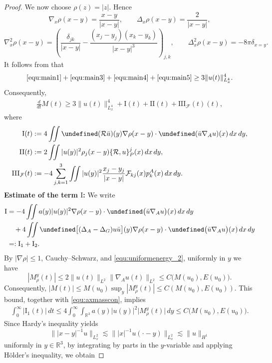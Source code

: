 \documentclass[10pt%
]{amsart}
\numberwithin{equation}{section}
\let\Im=\undefined\DeclareMathOperator*{\Im}{Im}
\newcommand{\R}{\mathbb{R}}
\theoremstyle{definition}
\newcommand{\Fcurv}{\mathcal{F}}
\begin{document}
\begin{proof}
	We now choose $\rho(z)=|z|$. Hence
	\[
	\nabla_x\rho(x-y)=\frac{x-y}{|x-y|},\qquad
	\Delta_x\rho(x-y)=\frac2{|x-y|},
	\]
	\[
	\nabla_x^2\rho(x-y)
	=\left(\frac{\delta_{jk}}{|x-y|}
	-\frac{(x_j-y_j)(x_k-y_k)}{|x-y|^3}\right)_{j,k},
	\qquad
	\Delta_x^2\rho(x-y)=-8\pi\delta_{x=y}.
	\]
	It follows from \cite[Section~4]{CCL} that
	\begin{equation}\label{equ:lowbtvz}
		\eqref{equ:main1}+\eqref{equ:main3}+\eqref{equ:main4}+\eqref{equ:main5}
		\ge3\|u(t)\|_{L_x^4}^4.
	\end{equation}
	Consequently,
	\begin{align}\label{equ:Maimt}
		\frac{d}{dt}M(t)
		\ge3\|u(t)\|_{L_x^4}^4+\mathrm I(t)+\mathrm{II}(t)+\mathrm{III}_{\Fcurv}(t)(t),
	\end{align}
	where
	\begin{align*}
	\mathrm I(t)
	&:=4\iint\Im(\mathcal R\bar u)(y)\nabla\rho(x-y)\cdot\Im(\bar u\nabla_Au)(x)\,dx\,dy,\\
	\mathrm{II}(t)
	&:=2\iint|u(y)|^2\rho_j(x-y)\{\mathcal R,u\}_P^j(x)\,dx\,dy,\\
	\mathrm{III}_{\Fcurv}(t)
	&:=-4\sum_{j,k=1}^3\iint|u(y)|^2
	\frac{x_j-y_j}{|x-y|}\Fcurv_{kj}(x)p_k^A(x)\,dx\,dy.
	\end{align*}
	{\bf Estimate of the term $\textrm{I}$:}  We write
	\begin{align*}
		\textrm{I}&=-4\iint a(y)|u(y)|^2\nabla \rho(x-y)\cdot \Im \big(\bar{u}\nabla_A u \big)(x)\,dx\,dy\\
		&\quad +4\iint \Im \big[ (\Delta_A-\Delta_G)u\bar{u}\big](y)\nabla \rho(x-y)\cdot \Im \big(\bar{u}\nabla_Au\big)(x)\,dx\,dy\\
		&=: \textrm{I}_1+\textrm{I}_2.
	\end{align*}
	By $|\nabla\rho|\le1$, Cauchy--Schwarz, and \eqref{equ:uniformenergy_2}, uniformly in $y$ we have
	\[
	|M_\rho^y(t)|\le2\|u(t)\|_{L^2}\|\nabla_Au(t)\|_{L^2}
	\le C\big(M(u_0),E(u_0)\big).
	\]
	Consequently, $|M(t)|\le M(u_0)\sup_y|M_\rho^y(t)|\le C(M(u_0),E(u_0))$.
	This bound, together with \eqref{equ:axmasscon}, implies
	\begin{align*}%
		\int_0^{\infty} |\textrm{I}_1(t)|\,dt
		\le 4\int_0^\infty \int_{\R^3} a(y)|u(y)|^2\big|M_\rho^y(t)\big|\,dy
		\le  C\big(M(u_0),E(u_0)\big). %
	\end{align*}
	Since Hardy's inequality yields
	$$
	\||x-y|^{-1}u\|_{L^2_x}\lesssim \||x|^{-1}u(\cdot -y)\|_{L^2_x}\lesssim \|u\|_{H^1}
	$$
	uniformly in $y\in \R^3$, by integrating by parts in the $y$-variable and applying H\"older's inequality, we obtain

\end{proof}
\end{document}
